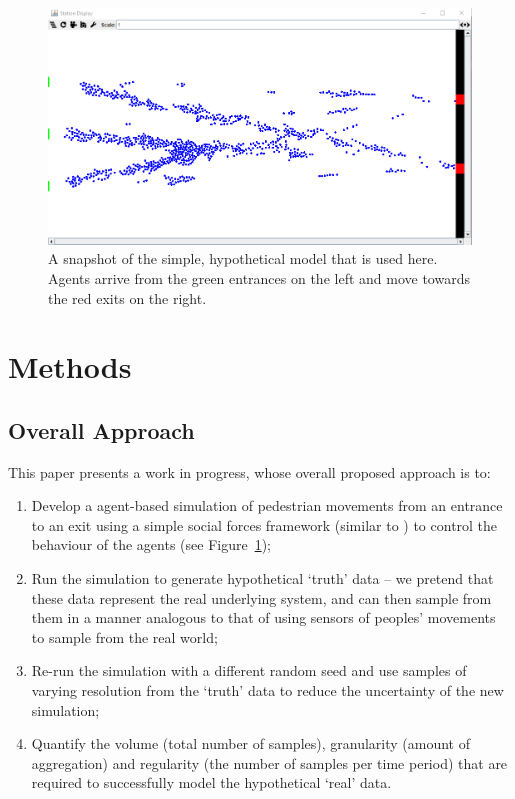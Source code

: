 \documentclass[runningheads]{llncs}
\begin{document}
\begin{figure}
\includegraphics[width=\textwidth]{figures/pedestrian_model_environment}
\caption{A snapshot of the simple, hypothetical model that is used here. Agents arrive from the green entrances on the left and move towards the red exits on the right.} \label{fig:pedestrian_model_environment}
\end{figure}

\section{Methods}

\subsection{Overall Approach}

This paper presents a work in progress, whose overall proposed approach is to:

\begin{enumerate}
\item Develop a  agent-based simulation of pedestrian movements from an entrance to an exit using a simple social forces framework (similar to \cite{helbing_social_1995}) to control the behaviour of the agents (see Figure~\ref{fig:pedestrian_model_environment});
\item Run the simulation to generate hypothetical `truth' data -- we pretend that these data represent the real underlying system, and can then sample from them in a manner analogous to that of using sensors of peoples' movements to sample from the real world;
\item \label{objectives:current} Re-run the simulation with a different random seed and use samples of varying resolution from the `truth' data to reduce the uncertainty of the new simulation;
\item \label{objectives:da} Quantify the volume (total number of samples), granularity (amount of aggregation) and regularity (the number of samples per time period) that are required to successfully model the hypothetical `real' data.
\end{enumerate}
\end{document}
